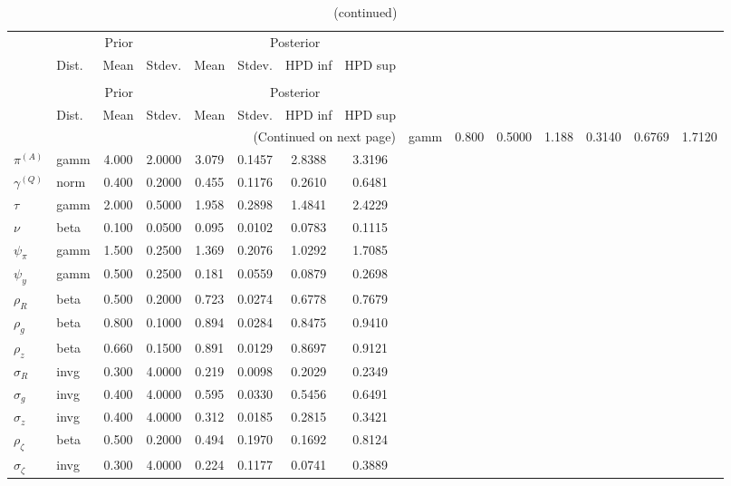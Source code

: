  
\begin{center}
\begin{longtable}{llcccccc} 
\caption{Results from Metropolis-Hastings (parameters)}
 \label{Table:MHPosterior:1}\\
\toprule 
  & \multicolumn{3}{c}{Prior}  &  \multicolumn{4}{c}{Posterior} \\
  \cmidrule(r{.75em}){2-4} \cmidrule(r{.75em}){5-8}
  & Dist. & Mean  & Stdev. & Mean & Stdev. & HPD inf & HPD sup\\
\midrule \endfirsthead 
\caption{(continued)}\\\toprule 
  & \multicolumn{3}{c}{Prior}  &  \multicolumn{4}{c}{Posterior} \\
  \cmidrule(r{.75em}){2-4} \cmidrule(r{.75em}){5-8}
  & Dist. & Mean  & Stdev. & Mean & Stdev. & HPD inf & HPD sup\\
\midrule \endhead 
\bottomrule \multicolumn{8}{r}{(Continued on next page)} \endfoot 
\bottomrule \endlastfoot 
${r_{A}}$ & gamm &   0.800 & 0.5000 &   1.188& 0.3140 &  0.6769 &  1.7120 \\ 
${\pi^{(A)}}$ & gamm &   4.000 & 2.0000 &   3.079& 0.1457 &  2.8388 &  3.3196 \\ 
${\gamma^{(Q)}}$ & norm &   0.400 & 0.2000 &   0.455& 0.1176 &  0.2610 &  0.6481 \\ 
${\tau}$ & gamm &   2.000 & 0.5000 &   1.958& 0.2898 &  1.4841 &  2.4229 \\ 
${\nu}$ & beta &   0.100 & 0.0500 &   0.095& 0.0102 &  0.0783 &  0.1115 \\ 
${\psi_\pi}$ & gamm &   1.500 & 0.2500 &   1.369& 0.2076 &  1.0292 &  1.7085 \\ 
${\psi_y}$ & gamm &   0.500 & 0.2500 &   0.181& 0.0559 &  0.0879 &  0.2698 \\ 
${\rho_R}$ & beta &   0.500 & 0.2000 &   0.723& 0.0274 &  0.6778 &  0.7679 \\ 
${\rho_{g}}$ & beta &   0.800 & 0.1000 &   0.894& 0.0284 &  0.8475 &  0.9410 \\ 
${\rho_z}$ & beta &   0.660 & 0.1500 &   0.891& 0.0129 &  0.8697 &  0.9121 \\ 
${\sigma_R}$ & invg &   0.300 & 4.0000 &   0.219& 0.0098 &  0.2029 &  0.2349 \\ 
${\sigma_{g}}$ & invg &   0.400 & 4.0000 &   0.595& 0.0330 &  0.5456 &  0.6491 \\ 
${\sigma_z}$ & invg &   0.400 & 4.0000 &   0.312& 0.0185 &  0.2815 &  0.3421 \\ 
${\rho_\zeta}$ & beta &   0.500 & 0.2000 &   0.494& 0.1970 &  0.1692 &  0.8124 \\ 
${\sigma_\zeta}$ & invg &   0.300 & 4.0000 &   0.224& 0.1177 &  0.0741 &  0.3889 \\ 
\end{longtable}
 \end{center}
